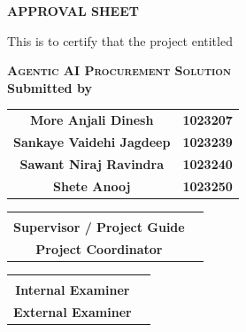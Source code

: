 
\begin{center}

{\LARGE\bf APPROVAL SHEET}

\vspace{1cm}

{\large This is to certify that the project entitled}\\[0.3cm]

{\Large\bf \textsc{Agentic AI Procurement Solution}\\[0.3cm]

{\large\bf Submitted by}\\[0.5cm]

\begin{table}[h]
\centering
\Large
\begin{tabular}{cc}
\textbf{More Anjali Dinesh} & \textbf{1023207} \\
\textbf{Sankaye Vaidehi Jagdeep} & \textbf{1023239} \\
\textbf{Sawant Niraj Ravindra} & \textbf{1023240} \\
\textbf{Shete Anooj} & \textbf{1023250}

\end{tabular}
\end{table}

\vspace{2cm}


\begin{tabular}{cc}
\begin{minipage}{0.42\textwidth}
\centering
\rule{5cm}{0.2px}\\
\textbf{Supervisor / Project Guide}
\end{minipage}
&
\begin{minipage}{0.42\textwidth}
\centering
\rule{5cm}{0.2px}\\
\textbf{Project Coordinator}
\end{minipage}
\end{tabular}

\vspace{2.2cm}


\begin{tabular}{cc}
\begin{minipage}{0.42\textwidth}
\centering
\rule{5cm}{0.2px}\\
\textbf{Internal Examiner}
\end{minipage}
&
\begin{minipage}{0.42\textwidth}
\centering
\rule{5cm}{0.2px}\\
\textbf{External Examiner}
\end{minipage}
\end{tabular}

}
\end{center}
